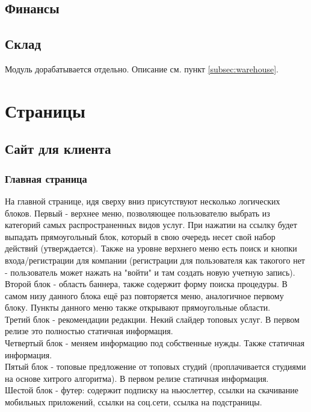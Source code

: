 \documentclass[DIV=calc, paper=a4, fontsize=11pt]{scrartcl} %
\begin{document}
\subsection{Финансы}

\subsection{Склад}
Модуль дорабатывается отдельно. Описание см. пункт \ref{subsec:warehouse}.

\section{Страницы}

\subsection{Сайт для клиента}

\subsubsection{Главная страница}

На главной странице, идя сверху вниз присутствуют несколько логических блоков. Первый - верхнее меню, позволяющее пользователю выбрать из категорий самых распространенных видов услуг. При нажатии на ссылку будет выпадать прямоугольный блок, который в свою очередь несет свой набор действий (утверждается). Также на уровне верхнего меню есть поиск и кнопки входа/регистрации для компании (регистрации для пользователя как такогого нет - пользователь может нажать на "войти" и там создать новую учетную запись).
\\Второй блок - область баннера, также содержит форму поиска процедуры. В самом низу данного блока ещё раз повторяется меню, аналогичное первому блоку. Пункты данного меню также открывают прямоугольные области.
\\Третий блок - рекомендации редакции. Некий слайдер топовых услуг. В первом релизе это полностью статичная информация.
\\Четвертый блок - меняем информацию под собственные нужды. Также статичная информация.
\\Пятый блок - топовые предложение от топовых студий (проплачивается студиями на основе хитрого алгоритма). В первом релизе статичная информация.
\\Шестой блок - футер: содержит подписку на ньюслеттер, ссылки на скачивание мобильных приложений, ссылки на соц.сети, ссылка на подстраницы.
\end{document}
